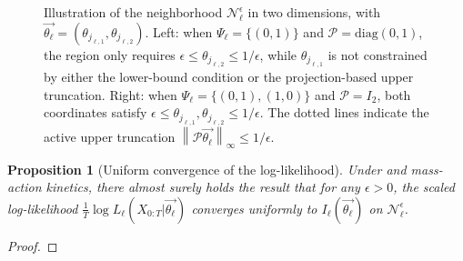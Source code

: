 \documentclass[pdflatex,sn-mathphys-num]{sn-jnl}%
\theoremstyle{thmstyleone}%
\newtheorem{proposition}[theorem]{Proposition}%
\theoremstyle{thmstyletwo}%
\theoremstyle{thmstylethree}%
\begin{document}
\begin{appendices}
\begin{figure}[h]
{%
    }
    \caption{Illustration of the neighborhood $\mathcal N_\ell^\epsilon$ in two dimensions, with $\overrightarrow{\theta_\ell}=(\theta_{j_{\ell,1}},\theta_{j_{\ell,2}})$. Left: when $\Psi_\ell=\{(0,1)\}$ and $\mathcal P=\mathrm{diag}(0,1)$, the region only requires $\epsilon\leq\theta_{j_{\ell,2}}\leq1/\epsilon$, while $\theta_{j_{\ell,1}}$ is not constrained by either the lower-bound condition or the projection-based upper truncation. Right: when $\Psi_\ell=\{(0,1),(1,0)\}$ and $\mathcal P=I_2$, both coordinates satisfy $\epsilon\leq\theta_{j_{\ell,1}},\theta_{j_{\ell,2}}\leq1/\epsilon$. The dotted lines indicate the active upper truncation $\left\|\mathcal P\overrightarrow{\theta_\ell}\right\|_\infty\leq1/\epsilon$.}
    \label{fig:neighborhood-region}
\end{figure}

\begin{proposition}[Uniform convergence of the log-likelihood]\label{proposition uniform convergence of the log-likelihood}
    Under  and mass-action kinetics, there almost surely holds the result that for any $\epsilon>0$, the scaled log-likelihood $\frac{1}{T}\log L_\ell\left(X_{0:T}\big|\overrightarrow{\theta_\ell}\right)$ converges uniformly to $I_{\ell}\left(\overrightarrow{\theta_\ell}\right)$ 
    on $\mathcal N_\ell^\epsilon$.
\end{proposition}

\begin{proof}


\end{proof}
\end{appendices}
\end{document}
